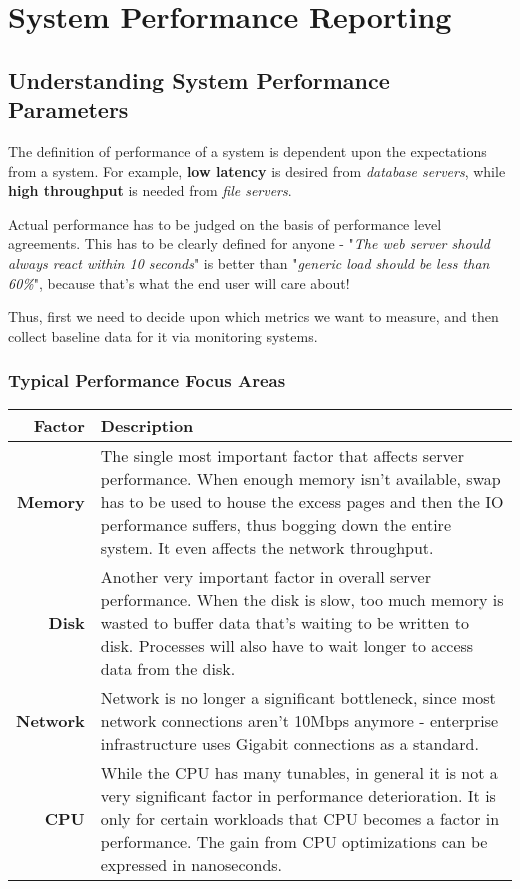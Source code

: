 \chapter{System Performance Reporting}
\section{Understanding System Performance Parameters}
The definition of performance of a system is dependent upon the expectations from a system. For example, \textbf{low latency} is desired from \textit{database servers}, while \textbf{high throughput} is needed from \textit{file servers}. 

Actual performance has to be judged on the basis of performance level agreements. This has to be clearly defined for anyone - "\textit{The web server should always react within 10 seconds}" is better than "\textit{generic load should be less than 60\%}", because that's what the end user will care about!

Thus, first we need to decide upon which metrics we want to measure, and then collect baseline data for it via monitoring systems. 

\subsection{Typical Performance Focus Areas}	
\noindent
\begin{tabular}{rM{0.84}}
	\toprule
	\textbf{Factor} &\textbf{Description} \\
	\midrule
	\textbf{Memory}	&The single most important factor that affects server performance. When enough memory isn't available, swap has to be used to house the excess pages and then the IO performance suffers, thus bogging down the entire system. It even affects the network throughput.\\
	\midrule
	\textbf{Disk} &Another very important factor in overall server performance. When the disk is slow, too much memory is wasted to buffer data that's waiting to be written to disk. Processes will also have to wait longer to access data from the disk. \\
	\midrule
	\textbf{Network} &Network is no longer a significant bottleneck, since most network connections aren't 10Mbps anymore - enterprise infrastructure uses Gigabit connections as a standard.\\
	\midrule
	\textbf{CPU} &While the CPU has many tunables, in general it is not a very significant factor in performance deterioration. It is only for certain workloads that CPU becomes a factor in performance. The gain from CPU optimizations can be expressed in nanoseconds. \\
	\bottomrule
\end{tabular}

